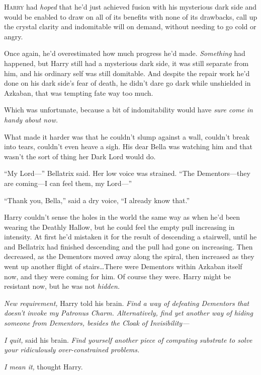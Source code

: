 
\lettrine{H}{arry} had \emph{hoped} that he’d just achieved fusion with his mysterious dark side and would be enabled to draw on all of its benefits with none of its drawbacks, call up the crystal clarity and indomitable will on demand, without needing to go cold or angry.

Once again, he’d overestimated how much progress he’d made. \emph{Something} had happened, but Harry still had a mysterious dark side, it was still separate from him, and his ordinary self was still domitable. And despite the repair work he’d done on his dark side’s fear of death, he didn’t dare go dark while unshielded in Azkaban, that was tempting fate way too much.

Which was unfortunate, because a bit of indomitability would have \emph{sure come in handy about now.}

What made it harder was that he couldn’t slump against a wall, couldn’t break into tears, couldn’t even heave a sigh. His dear Bella was watching him and that wasn’t the sort of thing her Dark Lord would do.

“My Lord—” Bellatrix said. Her low voice was strained. “The Dementors—they are coming—I can feel them, my Lord—”

“Thank you, Bella,” said a dry voice, “I already know that.”

Harry couldn’t sense the holes in the world the same way as when he’d been wearing the Deathly Hallow, but he could feel the empty pull increasing in intensity. At first he’d mistaken it for the result of descending a stairwell, until he and Bellatrix had finished descending and the pull had gone on increasing. Then decreased, as the Dementors moved away along the spiral, then increased as they went up another flight of stairs…There were Dementors within Azkaban itself now, and they were coming for him. Of course they were. Harry might be resistant now, but he was not \emph{hidden.}

\emph{New requirement,} Harry told his brain. \emph{Find a way of defeating Dementors that doesn’t invoke my Patronus Charm. Alternatively, find yet another way of hiding someone from Dementors, besides the Cloak of Invisibility—}

\emph{I quit,} said his brain. \emph{Find yourself another piece of computing substrate to solve your ridiculously over-constrained problems.}

\emph{I mean it,} thought Harry.


